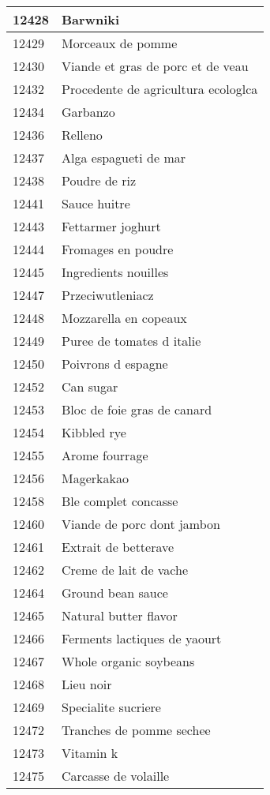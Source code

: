 \begin{longtable}{|l|l|}
12428 & Barwniki \\ \hline 
12429 & Morceaux de pomme \\ \hline 
12430 & Viande et gras de porc et de veau \\ \hline 
12432 & Procedente de agricultura ecologlca \\ \hline 
12434 & Garbanzo \\ \hline 
12436 & Relleno \\ \hline 
12437 & Alga espagueti de mar \\ \hline 
12438 & Poudre de riz \\ \hline 
12441 & Sauce huitre \\ \hline 
12443 & Fettarmer joghurt \\ \hline 
12444 & Fromages en poudre \\ \hline 
12445 & Ingredients nouilles \\ \hline 
12447 & Przeciwutleniacz \\ \hline 
12448 & Mozzarella en copeaux \\ \hline 
12449 & Puree de tomates d italie \\ \hline 
12450 & Poivrons d espagne \\ \hline 
12452 & Can sugar \\ \hline 
12453 & Bloc de foie gras de canard \\ \hline 
12454 & Kibbled rye \\ \hline 
12455 & Arome fourrage \\ \hline 
12456 & Magerkakao \\ \hline 
12458 & Ble complet concasse \\ \hline 
12460 & Viande de porc dont jambon \\ \hline 
12461 & Extrait de betterave \\ \hline 
12462 & Creme de lait de vache \\ \hline 
12464 & Ground bean sauce \\ \hline 
12465 & Natural butter flavor \\ \hline 
12466 & Ferments lactiques de yaourt \\ \hline 
12467 & Whole organic soybeans \\ \hline 
12468 & Lieu noir \\ \hline 
12469 & Specialite sucriere \\ \hline 
12472 & Tranches de pomme sechee \\ \hline 
12473 & Vitamin k \\ \hline 
12475 & Carcasse de volaille \\ \hline 

\end{longtable}
